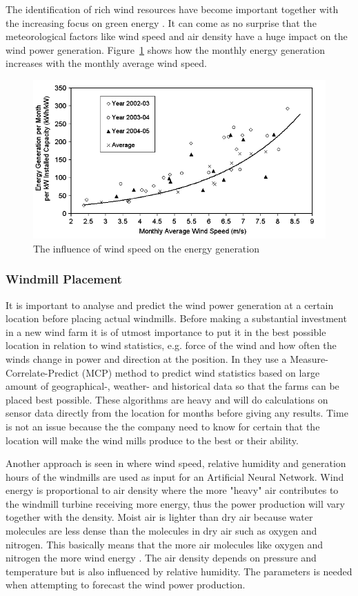 The identification of rich wind resources have become important together with the increasing focus on green energy \cite{WindPowerGenerationUsingANN}. It can come as no surprise that the meteorological factors like wind speed and air density have a huge impact on the wind power generation. Figure~\ref{fig:energyGeneration} shows how the monthly energy generation increases with the monthly average wind speed. 

\begin{figure}[h!]
\centering
\includegraphics[width=0.8\linewidth,natwidth=898,natheight=587]{billeder/EnergyGenerationVsWindSpeed.png}
\caption{The influence of wind speed on the energy generation \cite{WindPowerGenerationUsingANN}}
\label{fig:energyGeneration}
\end{figure} 

\subsubsection{Windmill Placement}
It is important to analyse and predict the wind power generation at a certain location before placing actual windmills. Before making a substantial investment in a new wind farm it is of utmost importance to put it in the best possible location in relation to wind statistics, e.g. force of the wind and how often the winds change in power and direction at the position. In \cite{4} they use a Measure-Correlate-Predict (MCP) method to predict wind statistics based on large amount of geographical-, weather- and historical data so that the farms can be placed best possible. These algorithms are heavy and will do calculations on sensor data directly from the location for months before giving any results. Time is not an issue because the the company need to know for certain that the location will make the wind mills produce to the best or their ability.

Another approach is seen in \cite{WindPowerGenerationUsingANN} where wind speed, relative humidity and generation hours of the windmills are used as input for an Artificial Neural Network. Wind energy is proportional to air density where the more "heavy" air contributes to the windmill turbine receiving more energy, thus the power production will vary together with the density. Moist air is lighter than dry air because water molecules are less dense than the molecules in dry air such as oxygen and nitrogen. This basically means that the more air molecules like oxygen and nitrogen the more wind energy \cite{AirDensityInForecast}.
The air density depends on pressure and temperature but is also influenced by relative humidity. The parameters is needed when attempting to forecast the wind power production.

